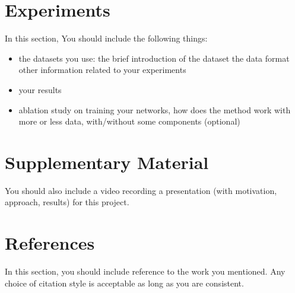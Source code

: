 \documentclass{article}
\begin{document}
\section{Experiments}

In this section, You should include the following things:

\begin{itemize}
    \item the datasets you use:
        \subitem the brief introduction of the dataset
        \subitem the data format
        \subitem other information related to your experiments
    \item your results
    \item ablation study on training your networks, how does the method work with more or less data, with/without some components (optional)
\end{itemize}


\section{Supplementary Material}

You should also include a video recording a presentation (with motivation, approach, results) for this project.

\section*{References}

In this section, you should include reference to the work you mentioned. Any choice of citation style is acceptable as long as you are consistent.
\end{document}
